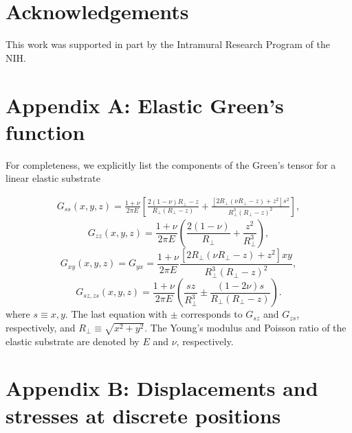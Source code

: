 \documentclass[aps,prl,reprint,twocolumn,groupedaddress,showpacs]{revtex4}
\begin{document}
\section{Acknowledgements}

This work was supported in part by the Intramural Research Program of the NIH.




\clearpage
\newpage 

\appendix
\begin{widetext}
\section{Appendix A: Elastic Green's function}

For completeness, we explicitly list the components of the Green's tensor 
for a linear elastic substrate \cite{LANDAU}

%
\begin{align}
G_{ss}(x,y,z) = \frac{1+\nu}{2\pi E}\left[\frac{2(1-\nu)R_{\perp}-z}{R_{\perp}(R_{\perp}-z)} + 
\frac{[2R_{\perp}(\nu R_{\perp}-z)+z^{2}]s^{2}}{R_{\perp}^{3}(R_{\perp}-z)^{2}}\right],
\end{align}
\begin{equation}
G_{zz}(x,y,z) =\frac{1+\nu}{2\pi E}\left(\frac{2(1-\nu)}
{R_{\perp}}+\frac{z^{2}}{R_{\perp}^{3}}\right),
\label{eq:Gzz0}
\end{equation}
\begin{equation} 
G_{xy}(x,y,z) = G_{yx}=\frac{1+\nu}{2\pi E}\frac{[2R_{\perp}(\nu R_{\perp}-z)+z^{2}]xy}{R_{\perp}^{3}
(R_{\perp}-z)^{2}},
\label{eq:Gxy0}
\end{equation}
\begin{equation}
G_{sz, zs}(x,y,z) =\frac{1+\nu}{2\pi E}\left(\frac{sz}{R_{\perp}^{3}}\pm\frac{(1-2\nu)s}{R_{\perp}
(R_{\perp}-z)}\right).
\end{equation}
%
where $s\equiv x,y$. The last equation with $\pm$ corresponds to
$G_{sz}$ and $G_{zs}$, respectively, and $R_{\perp} \equiv \sqrt{x^{2}
  +y^{2}}$. The Young's modulus and Poisson ratio of the elastic
substrate are denoted by $E$ and $\nu$, respectively.

\section{Appendix B: Displacements and stresses at discrete positions}


\end{widetext}
\end{document}
